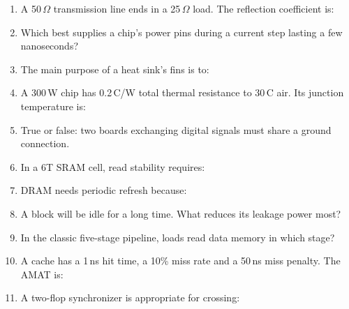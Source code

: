 \begin{enumerate}
  \item A 50\,$\Omega$ transmission line ends in a 25\,$\Omega$ load. The reflection coefficient is:

  \item Which best supplies a chip's power pins during a current step lasting a few nanoseconds?

  \item The main purpose of a heat sink's fins is to:

  \item A 300\,W chip has 0.2\,\textdegree C/W total thermal resistance to 30\,\textdegree C air. Its junction temperature is:

  \item True or false: two boards exchanging digital signals must share a ground connection.

  \item In a 6T SRAM cell, read stability requires:

  \item DRAM needs periodic refresh because:

  \item A block will be idle for a long time. What reduces its leakage power most?

  \item In the classic five-stage pipeline, loads read data memory in which stage?

  \item A cache has a 1\,ns hit time, a 10\% miss rate and a 50\,ns miss penalty. The AMAT is:

  \item A two-flop synchronizer is appropriate for crossing:


\end{enumerate}
